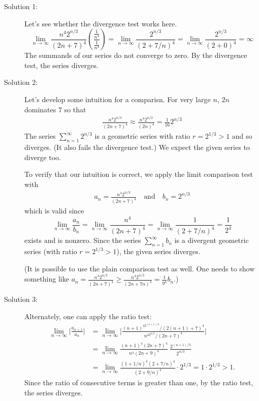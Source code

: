 \begin{solution}
\begin{description}
\item[Solution 1:]
Let's see whether the divergence test works here.
\[
\lim_{n\to\infty} \frac{n^4 2^{n/3}}{(2n+7)^4}\left(\frac{\frac{1}{n^4}}{\frac{1}{n^4}}\right) = \lim_{n\to\infty} \frac{2^{n/3}}{(2+7/n)^4} = \lim_{n\to\infty} \frac{2^{n/3}}{(2+0)^4} = \infty
\]
The summands of our series do not converge to zero. By the divergence
test, the series diverges.
\item[Solution 2:]
Let's develop some intuition for a comparisn. For very large $n$, $2n$ dominates
$7$ so that
\begin{align*}
\frac{n^4 2^{n/3}}{(2n+7)^4}
\approx \frac{n^4 2^{n/3}}{(2n)^4}
=\frac{1}{16}2^{n/3}
\end{align*}
The series $\displaystyle \sum_{n=1}^{\infty} 2^{n/3}$
is a geometric series with ratio $r=2^{1/3}>1$ and so diverges. (It also fails the divergence test.)
We expect the given series to diverge too.

To verify that  our intuition is correct,
we apply the limit comparison test with
\begin{align*}
a_n= \frac{n^4 2^{n/3}}{(2n+7)^4} \quad\text{and}\quad b_n= 2^{n/3}
\end{align*}
which is valid since
\begin{equation*}
\lim_{n\rightarrow\infty} \frac{a_n}{b_n}
=\lim_{n\rightarrow\infty}\frac{n^4}{(2n+7)^4}
=\lim_{n\rightarrow\infty}\frac{1}{{(2+7/n)}^4}
=\frac{1}{2^4}
\end{equation*}
exists and is nonzero. Since the series $\sum\limits_{n=1}^\infty b_n$ is
a divergent geometric series (with ratio $r=2^{1/3}>1$),
the given series diverges.
\medskip

(It is possible to use the plain comparison test as well.
One needs  to show something like $a_n = \frac{n^4 2^{n/3}}{(2n+7)^4}
\ge \frac{n^4 2^{n/3}}{(2n+7n)^4} = \frac{1}{9^4}b_n$.)
\medskip

\item[Solution 3:]
Alternately, one can apply the ratio test:
\begin{align*}
\lim_{n\to\infty} \bigg| \frac{a_{n+1}}{a_n} \bigg|
&= \lim_{n\to\infty} \bigg| \frac{(n+1)^42^{(n+1)/3}/(2(n+1)+7)^4}{n^42^{n/3}/(2n+7)^4} \bigg| \\
&= \lim_{n\to\infty} \frac{(n+1)^4(2n+7)^4}{n^4(2n+9)^4}\  \frac{2^{(n+1)/3}}{2^{n/3}} \\
&=\lim_{n\to\infty} \frac{(1+1/n)^4(2+7/n)^4}{(2+9/n)^4} \cdot2^{1/3}
= 1\cdot2^{1/3} > 1.
\end{align*}
Since the ratio of consecutive terms is greater than one, by the ratio test, the series diverges.
\end{description}
\end{solution}




